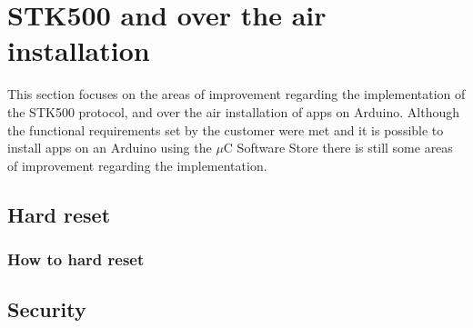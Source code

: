 \section{STK500 and over the air installation}
This section focuses on the areas of improvement regarding the implementation of the STK500 protocol, and over the air installation of apps on Arduino. Although the functional requirements set by the customer were met and it is possible to  install apps on an Arduino using the $\mu$C Software Store there is still some areas of improvement regarding the implementation.

	\subsection{Hard reset}

	\subsubsection{How to hard reset}
		
	\subsection{Security}
	